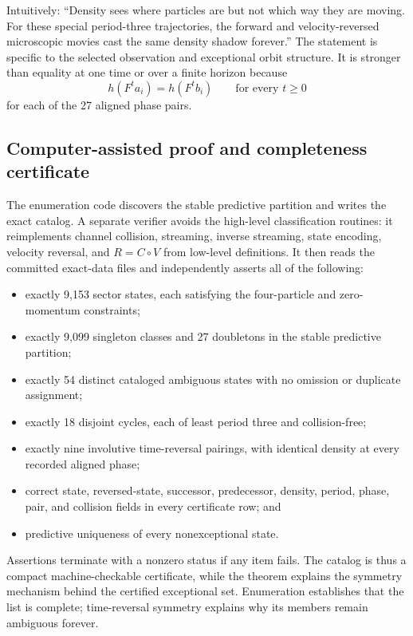 \documentclass[11pt]{article}
\begin{document}
Intuitively: ``Density sees where particles are but not which way they are moving.
For these special period-three trajectories, the forward and velocity-reversed
microscopic movies cast the same density shadow forever.'' The statement is
specific to the selected observation and exceptional orbit structure. It is
stronger than equality at one time or over a finite horizon because
\[
h(F^t a_i)=h(F^t b_i)\qquad\text{for every }t\geq0
\]
for each of the 27 aligned phase pairs.

\subsection{Computer-assisted proof and completeness certificate}

The enumeration code discovers the stable predictive partition and writes the
exact catalog. A separate verifier avoids the high-level classification routines:
it reimplements channel collision, streaming, inverse streaming, state encoding,
velocity reversal, and $R=C\circ V$ from low-level definitions. It then reads the
committed exact-data files and independently asserts all of the following:
\begin{itemize}[leftmargin=1.5em]
  \item exactly 9,153 sector states, each satisfying the four-particle and
  zero-momentum constraints;
  \item exactly 9,099 singleton classes and 27 doubletons in the stable predictive
  partition;
  \item exactly 54 distinct cataloged ambiguous states with no omission or
  duplicate assignment;
  \item exactly 18 disjoint cycles, each of least period three and collision-free;
  \item exactly nine involutive time-reversal pairings, with identical density at
  every recorded aligned phase;
  \item correct state, reversed-state, successor, predecessor, density, period,
  phase, pair, and collision fields in every certificate row; and
  \item predictive uniqueness of every nonexceptional state.
\end{itemize}
Assertions terminate with a nonzero status if any item fails. The catalog is thus
a compact machine-checkable certificate, while the theorem explains the symmetry
mechanism behind the certified exceptional set. Enumeration establishes that the
list is complete; time-reversal symmetry explains why its members remain
ambiguous forever.
\end{document}
